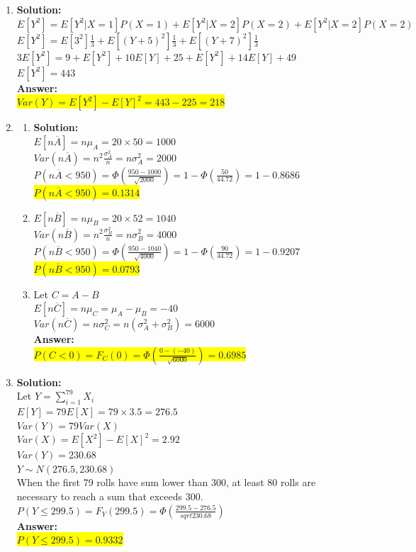 \documentclass{article}
\newcommand{\myansw}{\textbf{Answer:}\\}
\newcommand{\mysolu}{\textbf{Solution:}\\}
\begin{document}
\begin{enumerate}
\begin{enumerate}
		
	\end{enumerate}
	\item
	\mysolu
	$E[Y^2] = E[Y^2|X = 1]P(X = 1)+E[Y^2|X = 2]P(X = 2)+E[Y^2|X = 2]P(X = 2)$\\
	$E[Y^2] = E[3^2]\frac{1}{3}+E[(Y+5)^2]\frac{1}{3}+E[(Y+7)^2]\frac{1}{3}$\\
	$3E[Y^2] = 9+E[Y^2]+10E[Y]+25 + E[Y^2]+14E[Y]+49$\\
	$E[Y^2] = 443$\\
	\myansw
	\colorbox{yellow}{$Var(Y) = E[Y^2]-E[Y]^2 = 443 - 225 = 218$}\\
	\item
	\begin{enumerate}
		\item
		\mysolu
		$E[n\overline{A}] = n\mu_A = 20 \times 50 = 1000$\\
		$Var(n\overline{A}) = n^2\frac{\sigma_A^2}{n} = n\sigma_A^2 = 2000$\\
		$P(n\overline{A} < 950) = \Phi(\frac{950 - 1000}{\sqrt{2000}}) = 1 - \Phi(\frac{50}{44.72})= 1- 0.8686$\\
		\colorbox{yellow}{$P(n\overline{A} < 950)= 0.1314$}\\
		\item 
		$E[n\overline{B}] = n\mu_B = 20 \times 52 = 1040$\\
		$Var(n\overline{B}) = n^2\frac{\sigma_B^2}{n} = n\sigma_B^2 = 4000$\\
		$P(n\overline{B} < 950) = \Phi(\frac{950 - 1040}{\sqrt{4000}}) = 1 - \Phi(\frac{90}{44.72})= 1- 0.9207$\\
		\colorbox{yellow}{$P(n\overline{B} < 950)= 0.0793$}\\
		\item
		Let $C = A - B$\\
		$E[n\overline{C}] = n\mu_C= \mu_A - \mu_B = -40 $\\
		$Var(n\overline{C}) = n\sigma_C^2 = n(\sigma_A^2 + \sigma_B^2) = 6000$\\
		\myansw
		\colorbox{yellow}{$P(C < 0) = F_C(0) = \Phi(\frac{0-(-40)}{\sqrt{6000}})=0.6985$}\\
	\end{enumerate}
	\item
	\mysolu
	Let $Y = \sum\limits_{i = 1}^{79}X_i$\\
	$E[Y] = 79E[X] = 79\times3.5 = 276.5 $\\
	$Var(Y) = 79Var(X)  $\\
	$Var(X) = E[X^2] - E[X]^2 = 2.92$\\
	$Var(Y) = 230.68$\\
	$Y \sim N(276.5, 230.68)$\\
	When the first 79 rolls have sum lower than 300, at least 80 rolls are necessary to reach a sum that exceeds 300.\\
	$P(Y \leq 299.5) = F_Y(299.5)  = \Phi(\frac{299.5 - 276.5}{sqrt{230.68}})$\\
	\myansw
	\colorbox{yellow}{$P(Y \leq 299.5) = 0.9332$}\\
	

\end{enumerate}
\end{document}
